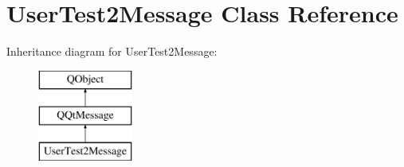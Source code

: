 \hypertarget{class_user_test2_message}{}\section{User\+Test2\+Message Class Reference}
\label{class_user_test2_message}
Inheritance diagram for User\+Test2\+Message\+:\begin{figure}[H]
\begin{center}
\leavevmode
\includegraphics[height=3.000000cm]{class_user_test2_message}
\end{center}
\end{figure}
